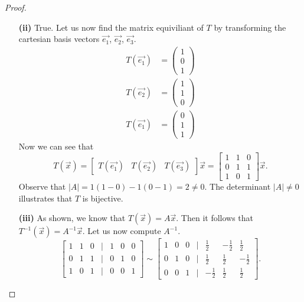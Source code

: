 \documentclass[ 12pt ]{article}
\begin{document}
\begin{enumerate}
\begin{proof}
\begin{enumerate}
				\item[\textbf{(ii)}] True. Let us now find the matrix equiviliant of $T$ by transforming the cartesian basis vectors $\vec{e_1}$, $\vec{e_2}$, $\vec{e_3}$.
					\begin{align*}
						T \left ( \vec{e_1} \right ) &= \begin{pmatrix} 1 \\ 0 \\ 1 \end{pmatrix} \\
						T \left ( \vec{e_2} \right ) &= \begin{pmatrix} 1 \\ 1 \\ 0 \end{pmatrix} \\
						T \left ( \vec{e_1} \right ) &= \begin{pmatrix} 0 \\ 1 \\ 1 \end{pmatrix}
					\end{align*}
					Now we can see that $$T \left ( \vec{x} \right ) =
					\begin{bmatrix} T \left ( \vec{e_1} \right ) & T \left ( \vec{e_2} \right ) & T \left ( \vec{e_3} \right ) \end{bmatrix} \vec{x} =
					\begin{bmatrix} 1 & 1 & 0 \\ 0 & 1 & 1 \\ 1 & 0 & 1 \end{bmatrix} \vec{x}.$$ Observe that $|A| = 1(1-0) - 1(0-1) = 2 \neq 0$. The determinant
					$|A| \neq 0$ illustrates that $T$ is bijective.
				\item[\textbf{(iii)}] As shown, we know that $T \left ( \vec{x} \right ) = A\vec{x}$. Then it follows that $T^{-1} \left ( \vec{x} \right ) = A^{-1}\vec{x}$.
					Let us now compute $A^{-1}$. $$\begin{bmatrix} 1 & 1 & 0 & | & 1 & 0 & 0 \\ 0 & 1 & 1 & | & 0 & 1 & 0 \\ 1 & 0 & 1 & | & 0 & 0 & 1 \end{bmatrix} \sim
					\begin{bmatrix} 1 & 0 & 0 & | & \frac{1}{2} & -\frac{1}{2} & \frac{1}{2} \\ 0 & 1 & 0 & | & \frac{1}{2} & \frac{1}{2} & -\frac{1}{2} \\ 0 & 0 & 1 & | & -\frac{1}{2} & \frac{1}{2} & \frac{1}{2} \end{bmatrix}.$$

\end{enumerate}
\end{proof}
\end{enumerate}
\end{document}
